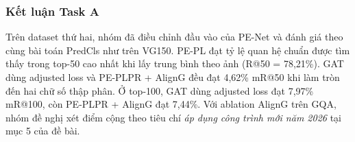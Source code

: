 \subsubsection{Kết luận Task A}
Trên dataset thứ hai, nhóm đã điều chỉnh đầu vào của PE-Net và đánh giá
theo cùng bài toán PredCls như trên VG150. PE-PL đạt tỷ lệ quan hệ chuẩn được tìm
thấy trong top-50 cao nhất khi lấy trung bình theo ảnh (R@50 = 78,21\%).
GAT dùng adjusted loss và PE-PLPR + AlignG đều đạt 4,62\% mR@50
khi làm tròn đến hai chữ số thập phân. Ở top-100, GAT dùng adjusted loss
đạt 7,97\% mR@100, còn PE-PLPR + AlignG đạt 7,44\%.
Với ablation AlignG trên GQA, nhóm đề nghị xét điểm cộng theo tiêu chí
\textit{áp dụng công trình mới năm 2026} tại mục 5 của đề bài.
